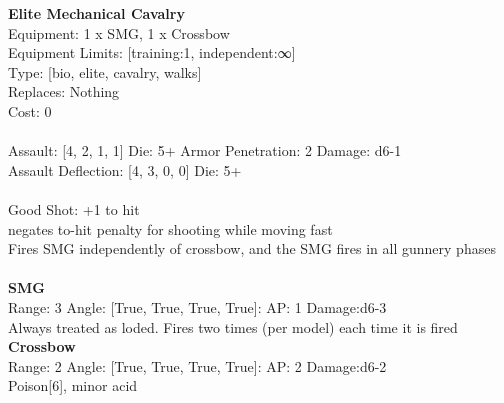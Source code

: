 \noindent 

{\bf Elite Mechanical Cavalry } \\
Equipment: 1 x SMG, 1 x Crossbow \\
Equipment Limits: [training:1, independent:∞] \\
Type: [bio, elite, cavalry, walks] \\
Replaces: Nothing \\
Cost: 0\\
\ \\
Assault: [4, 2, 1, 1] Die: 5+ Armor Penetration: 2 Damage: d6-1 \\
Assault Deflection: [4, 3, 0, 0] Die: 5+\\
\indent  
\ \\
Good Shot: +1 to hit\\ 
negates to-hit penalty for shooting while moving fast\\ 
Fires SMG independently of crossbow, and the SMG fires in all gunnery phases\\ 

\ \\
{\bf SMG } \\



Range: 3  Angle: [True, True, True, True]: AP: 1 Damage:d6-3 \\
Always treated as loded. Fires two times (per model) each time it is fired\\ 




{\bf Crossbow } \\



Range: 2  Angle: [True, True, True, True]: AP: 2 Damage:d6-2 \\
Poison[6], minor acid\\ 




 
\ \\



